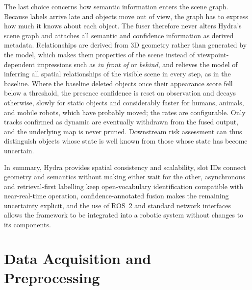 {\small The last choice concerns how semantic information enters the scene graph. Because labels arrive late and objects move out of view, the graph has to express how much it knows about each object. The fuser therefore never alters Hydra's scene graph and attaches all semantic and confidence information as derived metadata. Relationships are derived from 3D geometry rather than generated by the model, which makes them properties of the scene instead of viewpoint-dependent impressions such as \textit{in front of} or \textit{behind}, and relieves the model of inferring all spatial relationships of the visible scene in every step, as in the baseline. Where the baseline deleted objects once their appearance score fell below a threshold, the presence confidence is reset on observation and decays otherwise, slowly for static objects and considerably faster for humans, animals, and mobile robots, which have probably moved; the rates are configurable. Only tracks confirmed as dynamic are eventually withdrawn from the fused output, and the underlying map is never pruned. Downstream risk assessment can thus distinguish objects whose state is well known from those whose state has become uncertain.\par}

{\small In summary, Hydra provides spatial consistency and scalability, slot IDs connect geometry and semantics without making either wait for the other, asynchronous and retrieval-first labelling keep open-vocabulary identification compatible with near-real-time operation, confidence-annotated fusion makes the remaining uncertainty explicit, and the use of ROS~2 and standard network interfaces allows the framework to be integrated into a robotic system without changes to its components.\par}












\section{Data Acquisition and Preprocessing}
\label{sec:method_preprocessing}

